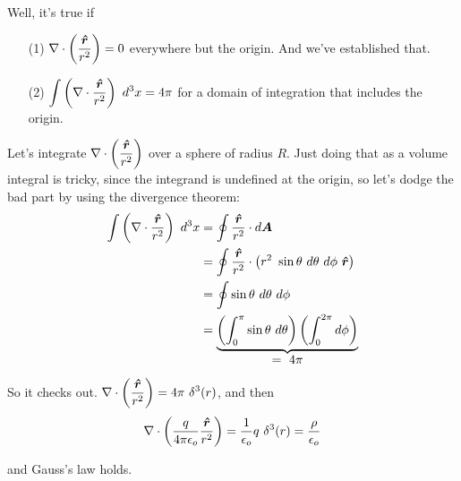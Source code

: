 \documentclass{article}
\begin{document}
Well, it's true if
\begin{enumerate}

\item[(1)] $\displaystyle \nabla \cdot \left( \frac{\bm{\hat{r}}}{r^2} \right) = 0$ everywhere but the origin. And we've established that.

\item[(2)] $\displaystyle \int \left( \nabla \cdot \frac{\bm{\hat{r}}}{r^2} \right)\ d^3x = 4\pi$ for a domain of integration that includes the origin.

\end{enumerate}

Let's integrate $\displaystyle \nabla \cdot \left( \frac{\bm{\hat{r}}}{r^2} \right)$ over a sphere of radius $R$. Just doing that as a volume integral is tricky, since the integrand is undefined at the origin, so let's dodge the bad part by using the divergence theorem:
\begin{align*}
    \int \left( \nabla \cdot \frac{\rhat}{r^2} \right)\ d^3x &= \oint \frac{\rhat}{r^2} \cdot d\bm{A} \\
    &= \oint \frac{\rhat}{r^2} \cdot \left( r^2\ \sin{\theta}\ d\theta\ d\phi\ \rhat \right) \\
    &= \oint \sin{\theta}\ d\theta\ d\phi \\
    &= \underbrace{\left( \int_0^{\pi} \sin{\theta}\ d\theta \right) \left( \int_0^{2\pi} d\phi \right)}_{\displaystyle =\ 4\pi}
\end{align*}

So it checks out. $\displaystyle \nabla \cdot \left( \frac{\bm{\hat{r}}}{r^2} \right) = 4\pi\ \delta^3(r)$, and then
\begin{equation*}
    \nabla \cdot \left( \frac{q}{4\pi\epsilon_o} \frac{\bm{\hat{r}}}{r^2} \right) = \frac{1}{\epsilon_o} q\ \delta^3(r) = \frac{\rho}{\epsilon_o}
\end{equation*}

and Gauss's law holds.
\end{document}
